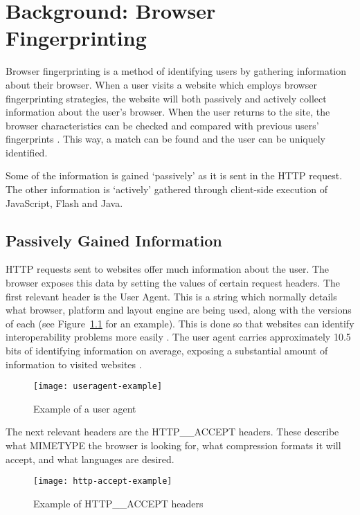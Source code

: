 \chapter{Background: Browser Fingerprinting}

Browser fingerprinting is a method of identifying users by gathering information about their browser.
When a user visits a website which employs browser fingerprinting strategies, the website will both passively and actively collect information about the user's browser.
When the user returns to the site, the browser characteristics can be checked and compared with previous users' fingerprints \citep{fingerprinting}.
This way, a match can be found and the user can be uniquely identified.

Some of the information is gained `passively' as it is sent in the HTTP request.
The other information is `actively' gathered through client-side execution of JavaScript, Flash and Java.

\section{Passively Gained Information}

HTTP requests sent to websites offer much information about the user.
The browser exposes this data by setting the values of certain request headers.
The first relevant header is the User Agent.
This is a string which normally details what browser, platform and layout engine are being used, along with the versions of each (see Figure~\ref{fig:useragent-example} for an example).
This is done so that websites can identify interoperability problems more easily \citep{useragent}.
The user agent carries approximately 10.5 bits of identifying information on average, exposing a substantial amount of information to visited websites \citep{useragententropy}.

\begin{figure}[h]
\texttt{[image: useragent-example]}
\centering
\caption{Example of a user agent}
\label{fig:useragent-example}
\end{figure}

The next relevant headers are the HTTP\_\_ACCEPT headers.
These describe what MIMETYPE the browser is looking for, what compression formats it will accept, and what languages are desired.

\begin{figure}[h]
\texttt{[image: http-accept-example]}
\centering
\caption{Example of HTTP\_\_ACCEPT headers}
\end{figure}

